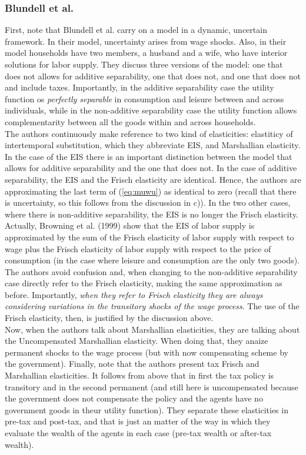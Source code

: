 \documentclass[11pt]{article}
\begin{document}
\subsubsection*{Blundell et al.}
First, note that Blundell et al. carry on a model in a dynamic, uncertain framework. In their model, uncertainty arises from wage shocks. Also, in their model households have two members, a husband and a wife, who have interior solutions for labor supply. They discuss three versions of the model: one that does not allows for additive separability, one that does not, and one that does not and include taxes. Importantly, in the additive separability case the utility function os \textit{perfectly separable} in consumption and leisure between and across individuals, while in the non-additive separability case the utility function allows complementarity between all the goods within and across households. \\ 
\indent The authors continuously make reference to two kind of elasticities: elastiticy of intertemporal substitution, which they abbreviate EIS, and Marshallian elasticity. In the case of the EIS there is an important distinction between the model that allows for additive separability and the one that does not. In the case of additive separability, the EIS and the Frisch elasticity are identical. Hence, the authors are approximating the last term of (\ref{eq:muwu}) as identical to zero (recall that there is uncertainty, so this follows from the discussion in c)). In the two other cases, where there is non-additive separability, the EIS is no longer the Frisch elasticity. Actually, Browning et al. (1999) show that the EIS of labor supply is approximated by the sum of the Frisch elasticity of labor supply with respect to wage plus the  Frisch elasticity of labor supply with respect to the price of consumption (in the case where leisure and consumption are the only two goods). The authors avoid confusion and, when changing to the non-additive separability case directly refer to the Frisch elasticity, making the same approximation as before. Importantly, \textit{when they refer to Frisch elasticity they are always considering variations in the transitory shocks of the wage process}. The use of the Frisch elasticity, then, is justified by the discussion above.\\
\indent Now, when the authors talk about Marshallian elasticities, they are talking about the Uncompensated Marshallian elasticity. When doing that, they anaize permanent shocks to the wage process (but with now compensating scheme by the government). Finally, note that the authors present tax Frisch and Marshallian elasticities. It follows from above that in first the tax policy is transitory and in the second permanent (and still here is uncompensated because the government does not compensate the policy and the agents have no government goods in theur utility function). They separate these elasticities in pre-tax and post-tax, and that is just an matter of the way in which they evaluate the wealth of the agents in each case (pre-tax wealth or after-tax wealth).
\end{document}

